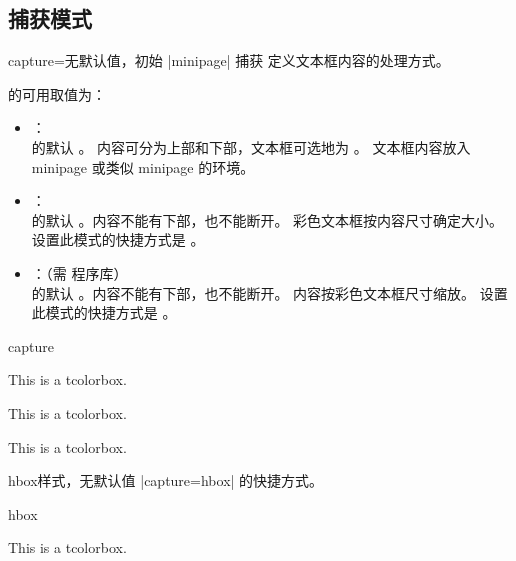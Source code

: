
{\tcbuselistingtext}


\clearpage
\subsection{捕获模式}\label{subsec:capture}

\begin{docTcbKey}{capture}{=}{无默认值，初始 |minipage|}
  捕获  定义文本框内容的处理方式。

 的可用取值为：
\begin{itemize}
\item{}：\\
   的默认 。
  内容可分为上部和下部，文本框可选地为 。
  文本框内容放入 minipage 或类似 minipage 的环境。
\item{}：\\
   的默认 。内容不能有下部，也不能断开。
  彩色文本框按内容尺寸确定大小。
  设置此模式的快捷方式是 。
\item{}：（需  程序库）\\
   的默认 。内容不能有下部，也不能断开。
  内容按彩色文本框尺寸缩放。
  设置此模式的快捷方式是 。
\end{itemize}

\begin{exdispExample}{capture}

\begin{tcolorbox}[capture=minipage]
This is a tcolorbox.
\end{tcolorbox}

\begin{tcolorbox}[capture=hbox]
This is a tcolorbox.
\end{tcolorbox}

\begin{tcolorbox}[capture=fitbox,height=9mm]%
This is a tcolorbox.
\end{tcolorbox}
\end{exdispExample}
\end{docTcbKey}



\begin{docTcbKey}{hbox}{}{样式，无默认值}
  |capture=hbox| 的快捷方式。
\begin{exdispExample}{hbox}

\begin{tcolorbox}[hbox]
This is a tcolorbox.
\end{tcolorbox}
\end{exdispExample}
\end{docTcbKey}


